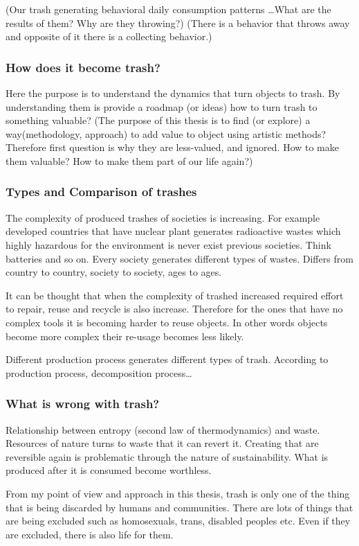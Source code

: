 (Our trash generating behavioral daily consumption patterns \ldots What are the results of them? Why are they throwing?) (There is a behavior that throws away and opposite of it there is a collecting behavior.) 

%
\subsubsection{How does it become trash?}
Here the purpose is to understand the dynamics that turn objects to trash. By understanding them is provide a roadmap (or ideas) how to turn trash to something valuable? (The purpose of this thesis is to find (or explore) a way(methodology, approach) to add value to object using artistic methods? Therefore first question is why they are less-valued, and ignored. How to make them valuable? How to make them part of our life again?)

%
\subsubsection{Types and Comparison of trashes}
The complexity of produced trashes of societies is increasing. For example developed countries that have nuclear plant generates radioactive wastes which highly hazardous for the environment is never exist previous societies. Think batteries and so on. Every society generates different types of wastes. Differs from country to country, society to society, ages to ages.

It can be thought that when the complexity of trashed increased required effort to repair, reuse and recycle is also increase. Therefore for the ones that have no complex tools it is becoming harder to reuse objects. In other words objects become more complex their re-usage becomes less likely. 

Different production process generates different types of trash. According to production process, decomposition process\ldots

%
\subsubsection{What is wrong with trash?}
Relationship between entropy (second law of thermodynamics) and waste. Resources of nature turns to waste that it can revert it. Creating that are reversible again is problematic through the nature of sustainability. What is produced after it is consumed become worthless. 

From my point of view and approach in this thesis, trash is only one of the thing that is being discarded by humans and communities. There are lots of things that are being excluded such as homosexuals, trans, disabled peoples etc. Even if they are excluded, there is also life for them. 

